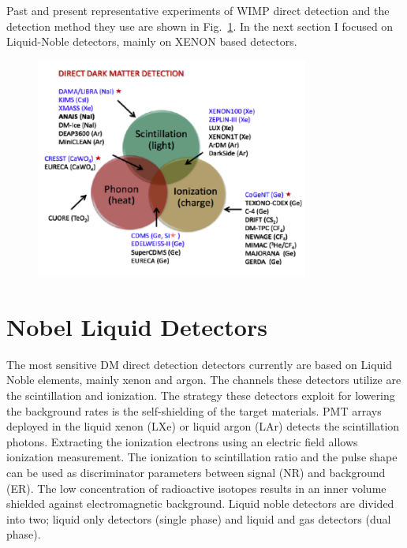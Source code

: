Past and present representative experiments of WIMP direct detection and the detection method they use are shown in Fig.~\ref{fig:det_strategy}. In the next section I focused on Liquid-Noble detectors, mainly on XENON based detectors.  

\begin{figure}[]
	\centering
	\includegraphics[width=0.8\textwidth]{figs/DetChannels.png}
	\label{fig:det_strategy}
\end{figure}

\section{Nobel Liquid Detectors}
\label{sec:liquidDet}

The most sensitive DM direct detection detectors currently are based on Liquid Noble elements, mainly xenon and argon. The channels these detectors utilize are the scintillation and ionization. The strategy these detectors exploit for lowering the background rates is the self-shielding of the target materials. PMT arrays deployed in the liquid xenon (LXe) or liquid argon (LAr) detects the scintillation photons. Extracting the ionization electrons using an electric field allows ionization measurement. The ionization to scintillation ratio and the pulse shape can be used as discriminator parameters between signal (NR) and background (ER). The low concentration of radioactive isotopes results in an inner volume shielded against electromagnetic background. Liquid noble detectors are divided into two; liquid only detectors (single phase) and liquid and gas detectors (dual phase).

